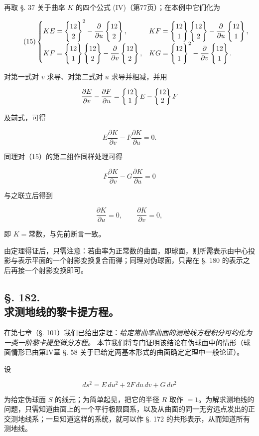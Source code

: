 再取 §. 37 关于曲率 $K$ 的四个公式 (IV)（第77页）；在本例中它们化为

\[
\tag{15}
\begin{cases}
KE=\left\{\begin{matrix}12\\2\end{matrix}\right\}^{2}-\dfrac{\partial}{\partial u}\left\{\begin{matrix}12\\2\end{matrix}\right\},&
KF=\left\{\begin{matrix}12\\1\end{matrix}\right\}\left\{\begin{matrix}12\\2\end{matrix}\right\}-\dfrac{\partial}{\partial u}\left\{\begin{matrix}12\\1\end{matrix}\right\},\\[.4em]
KF=\left\{\begin{matrix}12\\1\end{matrix}\right\}\left\{\begin{matrix}12\\2\end{matrix}\right\}-\dfrac{\partial}{\partial v}\left\{\begin{matrix}12\\2\end{matrix}\right\},&
KG=\left\{\begin{matrix}12\\1\end{matrix}\right\}^{2}-\dfrac{\partial}{\partial v}\left\{\begin{matrix}12\\1\end{matrix}\right\}.
\end{cases}
\]

对第一式对 $v$ 求导、对第二式对 $u$ 求导并相减，并用

\[
 \frac{\partial E}{\partial v}-\frac{\partial F}{\partial u}=\left\{\begin{matrix}12\\1\end{matrix}\right\}E-\left\{\begin{matrix}12\\2\end{matrix}\right\}F
\]

及前式，可得

\[
\tag{16}
 E\frac{\partial K}{\partial v}-F\frac{\partial K}{\partial u}=0.
\]

同理对（15）的第二组作同样处理可得

\[
 F\frac{\partial K}{\partial v}-G\frac{\partial K}{\partial u}=0
\]

与之联立后得到

\[
 \frac{\partial K}{\partial u}=0,
 \qquad
 \frac{\partial K}{\partial v}=0,
\]

即 $K=\text{常数}$，与先前断言一致。



由定理得证后，只需注意：若曲率为正常数的曲面，即球面，则所需表示由中心投影与表示平面的一个射影变换复合而得；同理对伪球面，只需在 §. 180 的表示之后再接一个射影变换即可。



\subsection*{§. 182.\\ 求测地线的黎卡提方程。}



在第七章（§. 101）我们已给出定理：\emph{给定常曲率曲面的测地线方程积分可约化为一类一阶黎卡提型微分方程。} 本节我们将专门证明该结论在伪球面中的情形（球面情形已由第IV章 §. 58 关于已给定两基本形式的曲面确定定理中一般论证）。



设

\[
 ds^2=E\,du^2+2F\,du\,dv+G\,dv^2
\]

为给定伪球面 \(S\) 的线元；为简单起见，把它的半径 \(R\) 取作 \(=1\)。为解求测地线的问题，只需知道曲面上的一个平行极限圆系，以及从曲面的同一无穷远点发出的正交测地线系；一旦知道这样的系统，就可以作 §. 172 的共形表示，从而知道所有测地线。



